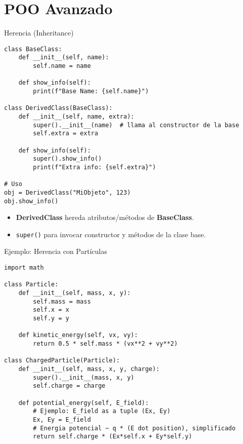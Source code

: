 \documentclass[10pt]{beamer}
\begin{document}
\section{POO Avanzado}

\begin{frame}[fragile]{Herencia (Inheritance)}
\begin{verbatim}
class BaseClass:
    def __init__(self, name):
        self.name = name
    
    def show_info(self):
        print(f"Base Name: {self.name}")

class DerivedClass(BaseClass):
    def __init__(self, name, extra):
        super().__init__(name)  # llama al constructor de la base
        self.extra = extra
    
    def show_info(self):
        super().show_info()
        print(f"Extra info: {self.extra}")

# Uso
obj = DerivedClass("MiObjeto", 123)
obj.show_info()
\end{verbatim}
\begin{itemize}
  \item \textbf{DerivedClass} hereda atributos/métodos de \textbf{BaseClass}.
  \item \texttt{super()} para invocar constructor y métodos de la clase base.
\end{itemize}
\end{frame}

\begin{frame}[fragile]{Ejemplo: Herencia con Partículas}
\begin{verbatim}
import math

class Particle:
    def __init__(self, mass, x, y):
        self.mass = mass
        self.x = x
        self.y = y

    def kinetic_energy(self, vx, vy):
        return 0.5 * self.mass * (vx**2 + vy**2)

class ChargedParticle(Particle):
    def __init__(self, mass, x, y, charge):
        super().__init__(mass, x, y)
        self.charge = charge

    def potential_energy(self, E_field):
        # Ejemplo: E_field as a tuple (Ex, Ey)
        Ex, Ey = E_field
        # Energia potencial ~ q * (E dot position), simplificado
        return self.charge * (Ex*self.x + Ey*self.y)
\end{verbatim}
\end{frame}
\end{document}
